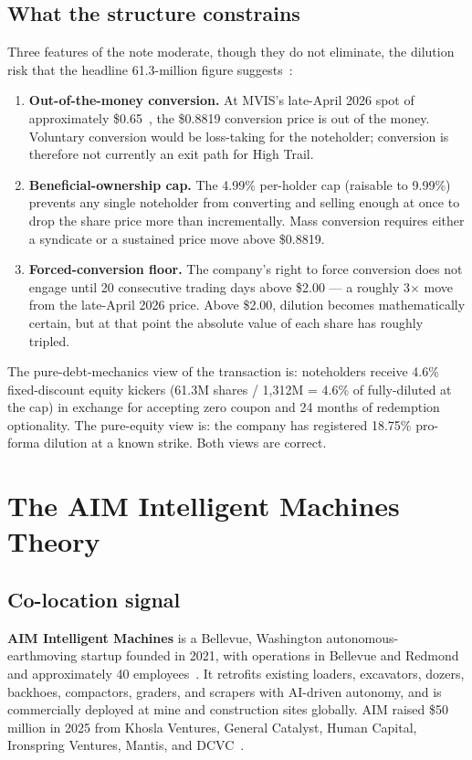 \documentclass[10pt,letterpaper,twocolumn]{article}
\begin{document}
\subsection{What the structure constrains}

Three features of the note moderate, though they do not eliminate, the dilution risk that the headline 61.3-million figure suggests~\citep{simplywallst2026notes}:

\begin{enumerate}
  \item \textbf{Out-of-the-money conversion.} At MVIS's late-April 2026 spot of approximately \$0.65~\citep{yahoo2026mvis}, the \$0.8819 conversion price is out of the money. Voluntary conversion would be loss-taking for the noteholder; conversion is therefore not currently an exit path for High Trail.
  \item \textbf{Beneficial-ownership cap.} The 4.99\% per-holder cap (raisable to 9.99\%) prevents any single noteholder from converting and selling enough at once to drop the share price more than incrementally. Mass conversion requires either a syndicate or a sustained price move above \$0.8819.
  \item \textbf{Forced-conversion floor.} The company's right to force conversion does not engage until 20 consecutive trading days above \$2.00 --- a roughly 3$\times$ move from the late-April 2026 price. Above \$2.00, dilution becomes mathematically certain, but at that point the absolute value of each share has roughly tripled.
\end{enumerate}

The pure-debt-mechanics view of the transaction is: noteholders receive 4.6\% fixed-discount equity kickers (61.3M shares / 1{,}312M = 4.6\% of fully-diluted at the cap) in exchange for accepting zero coupon and 24 months of redemption optionality. The pure-equity view is: the company has registered 18.75\% pro-forma dilution at a known strike. Both views are correct.

\section{The AIM Intelligent Machines Theory}\label{sec:aim}

\subsection{Co-location signal}

\textbf{AIM Intelligent Machines} is a Bellevue, Washington autonomous-earthmoving startup founded in 2021, with operations in Bellevue and Redmond and approximately 40 employees~\citep{aim2026site,geekwire2025aim}. It retrofits existing loaders, excavators, dozers, backhoes, compactors, graders, and scrapers with AI-driven autonomy, and is commercially deployed at mine and construction sites globally. AIM raised \$50 million in 2025 from Khosla Ventures, General Catalyst, Human Capital, Ironspring Ventures, Mantis, and DCVC~\citep{businesswire2025aim,425business2025aim}.
\end{document}
